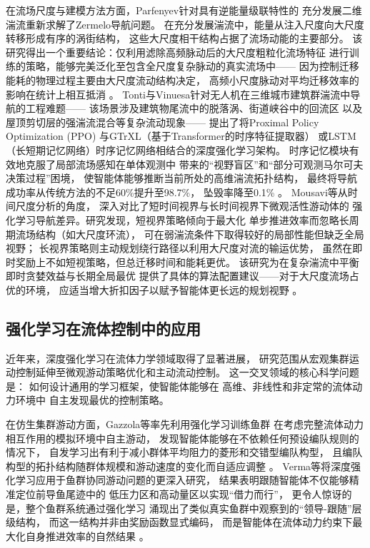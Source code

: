 在流场尺度与建模方法方面，Parfenyev针对具有逆能量级联特性的
充分发展二维湍流重新求解了Zermelo导航问题。
在充分发展湍流中，能量从注入尺度向大尺度转移形成有序的涡街结构，
这些大尺度相干结构占据了流场动能的主要部分。
该研究得出一个重要结论：仅利用滤除高频脉动后的大尺度粗粒化流场特征
进行训练的策略，能够完美泛化至包含全尺度复杂脉动的真实流场中——
因为控制迁移能耗的物理过程主要由大尺度流动结构决定，
高频小尺度脉动对平均迁移效率的影响在统计上相互抵消
\cite{parfenyevOptimalNavigationTwoDimensional2025}。
Tonti与Vinuesa针对无人机在三维城市建筑群湍流中导航的工程难题——
该场景涉及建筑物尾流中的脱落涡、街道峡谷中的回流区
以及屋顶剪切层的强湍流混合等复杂流动现象——
提出了将Proximal Policy Optimization (PPO)
与GTrXL（基于Transformer的时序特征提取器）
或LSTM（长短期记忆网络）时序记忆网络相结合的深度强化学习架构。
时序记忆模块有效地克服了局部流场感知在单体观测中
带来的“视野盲区”和“部分可观测马尔可夫决策过程”困境，
使智能体能够推断当前所处的高维湍流拓扑结构，
最终将导航成功率从传统方法的不足60\%提升至98.7\%，
坠毁率降至0.1\%
\cite{tontiNavigationThreeDimensionalUrban2025}。
Mousavi等从时间尺度分析的角度，
深入对比了短时间视界与长时间视界下微观活性游动体的
强化学习导航差异。研究发现，短视界策略倾向于最大化
单步推进效率而忽略长周期流场结构（如大尺度环流），
可在弱湍流条件下取得较好的局部性能但缺乏全局视野；
长视界策略则主动规划绕行路径以利用大尺度对流的输运优势，
虽然在即时奖励上不如短视策略，但总迁移时间和能耗更优。
该研究为在复杂湍流中平衡即时贪婪效益与长期全局最优
提供了具体的算法配置建议——对于大尺度流场占优的环境，
应适当增大折扣因子以赋予智能体更长远的规划视野
\cite{mousaviShortTermLongTerm2025}。
\subsection{强化学习在流体控制中的应用}

近年来，深度强化学习在流体力学领域取得了显著进展，
研究范围从宏观集群运动控制延伸至微观游动策略优化和主动流动控制。
这一交叉领域的核心科学问题是：
如何设计通用的学习框架，使智能体能够在
高维、非线性和非定常的流体动力环境中
自主发现最优的控制策略。

在仿生集群游动方面，Gazzola等率先利用强化学习训练鱼群
在考虑完整流体动力相互作用的模拟环境中自主游动，
发现智能体能够在不依赖任何预设编队规则的情况下，
自发学习出有利于减小群体平均阻力的菱形和交错型编队构型，
且编队构型的拓扑结构随群体规模和游动速度的变化而自适应调整
\cite{gazzolaLearningSchoolPresence2016}。
Verma等将深度强化学习应用于鱼群协同游动问题的更深入研究，
结果表明跟随智能体不仅能够精准定位前导鱼尾迹中的
低压力区和高动量区以实现“借力而行”，
更令人惊讶的是，整个鱼群系统通过强化学习
涌现出了类似真实鱼群中观察到的“领导-跟随”层级结构，
而这一结构并非由奖励函数显式编码，
而是智能体在流体动力约束下最大化自身推进效率的自然结果
\cite{vermaEfficientCollectiveSwimming2018}。

